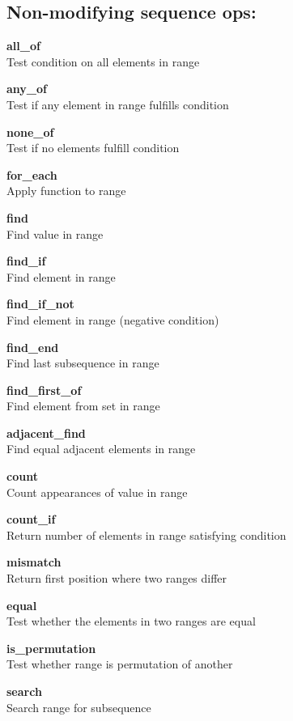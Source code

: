\documentclass[table]{article}
\begin{document}
	\pagebreak
	\normalsize
	\begin{multicols}{2}
	\subsection*{Non-modifying sequence ops:}
	
	\textbf{all\_of}\\
	Test condition on all elements in range
	
	\textbf{any\_of}\\
	Test if any element in range fulfills condition
	
	\textbf{none\_of}\\
	Test if no elements fulfill condition
	
	\textbf{for\_each}\\
	Apply function to range
	
	\textbf{find}\\
	Find value in range
	
	\textbf{find\_if}\\
	Find element in range
	
	\textbf{find\_if\_not}\\
	Find element in range (negative condition)
	
	\textbf{find\_end}\\
	Find last subsequence in range
	
	\textbf{find\_first\_of}\\
	Find element from set in range
	
	\textbf{adjacent\_find}\\
	Find equal adjacent elements in range
	
	\textbf{count}\\
	Count appearances of value in range
	
	\textbf{count\_if}\\
	Return number of elements in range satisfying condition
	
	\textbf{mismatch}\\
	Return first position where two ranges differ
	
	\textbf{equal}\\
	Test whether the elements in two ranges are equal
	
	\textbf{is\_permutation}\\
	Test whether range is permutation of another
	
	\textbf{search}\\
	Search range for subsequence
	

\end{multicols}
\end{document}
